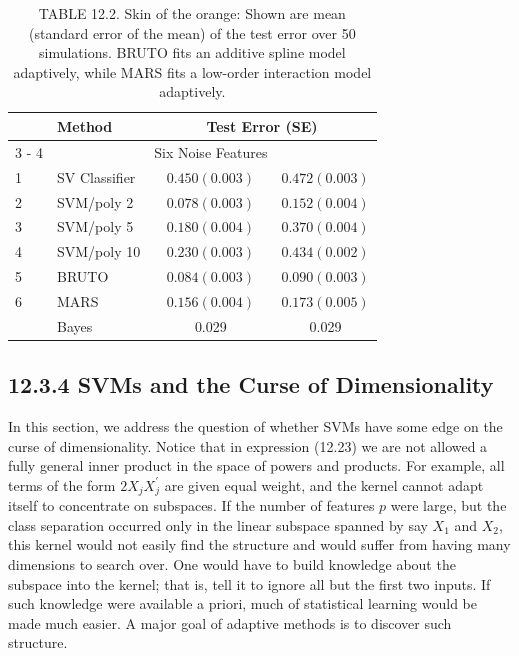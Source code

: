 \documentclass[10pt]{article}
\begin{document}
\begin{table}[h]
\begin{center}
\captionsetup{labelformat=empty}
\caption{TABLE 12.2. Skin of the orange: Shown are mean (standard error of the mean) of the test error over 50 simulations. BRUTO fits an additive spline model adaptively, while MARS fits a low-order interaction model adaptively.}
\begin{tabular}{ll|cc}
\hline
\multirow{2}{*}{} & \multirow{2}{*}{Method} & \multicolumn{2}{|c}{Test Error (SE)} \\
\cline { 3 - 4 }
 &  & Six Noise Features &  \\
\hline
1 & SV Classifier & $0.450(0.003)$ & $0.472(0.003)$ \\
2 & SVM/poly 2 & $0.078(0.003)$ & $0.152(0.004)$ \\
3 & SVM/poly 5 & $0.180(0.004)$ & $0.370(0.004)$ \\
4 & SVM/poly 10 & $0.230(0.003)$ & $0.434(0.002)$ \\
5 & BRUTO & $0.084(0.003)$ & $0.090(0.003)$ \\
6 & MARS & $0.156(0.004)$ & $0.173(0.005)$ \\
 & Bayes & 0.029 & 0.029 \\
\hline
\end{tabular}
\end{center}
\end{table}

\subsection*{12.3.4 SVMs and the Curse of Dimensionality}
In this section, we address the question of whether SVMs have some edge on the curse of dimensionality. Notice that in expression (12.23) we are not allowed a fully general inner product in the space of powers and products. For example, all terms of the form $2 X_{j} X_{j}^{\prime}$ are given equal weight, and the kernel cannot adapt itself to concentrate on subspaces. If the number of features $p$ were large, but the class separation occurred only in the linear subspace spanned by say $X_{1}$ and $X_{2}$, this kernel would not easily find the structure and would suffer from having many dimensions to search over. One would have to build knowledge about the subspace into the kernel; that is, tell it to ignore all but the first two inputs. If such knowledge were available a priori, much of statistical learning would be made much easier. A major goal of adaptive methods is to discover such structure.
\end{document}
